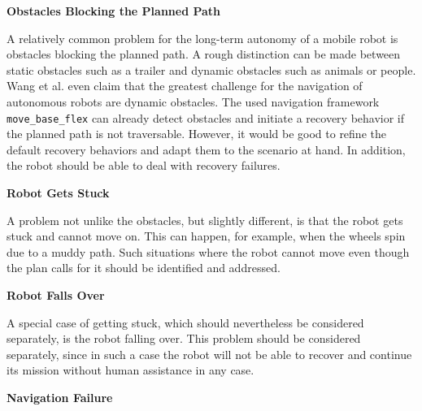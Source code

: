 \documentclass[english, master, utf8]{base/thesis_KBS}
\newcommand{\code}[1]{\colorbox{light-gray}{\texttt{#1}}}
\begin{document}
\noindent
\textbf{Obstacles Blocking the Planned Path}\newline

\noindent
A relatively common problem for the long-term autonomy of a mobile robot is obstacles blocking the planned path.
A rough distinction can be made between static obstacles such as a trailer and dynamic obstacles such as animals or people.
Wang et al. \cite{Wang:2018} even claim that the greatest challenge for the navigation of autonomous robots are dynamic obstacles.
The used navigation framework \code{move\_base\_flex} can already detect obstacles and initiate a recovery behavior if the planned path is not traversable.
However, it would be good to refine the default recovery behaviors and adapt them to the scenario at hand. In addition, the robot should be able to deal with
recovery failures.\newline

\noindent
\textbf{Robot Gets Stuck}\newline

\noindent
A problem not unlike the obstacles, but slightly different, is that the robot gets stuck and cannot move on. This can happen, for example, when the wheels spin due 
to a muddy path. Such situations where the robot cannot move even though the plan calls for it should be identified and addressed.\newline

\noindent
\textbf{Robot Falls Over}\newline

\noindent
A special case of getting stuck, which should nevertheless be considered separately, is the robot falling over.
This problem should be considered separately, since in such a case the robot will not be able to recover and continue its mission without human assistance in any case.\newline

\noindent
\textbf{Navigation Failure}\newline
\end{document}
